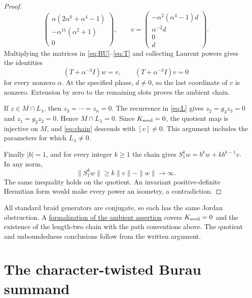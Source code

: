 \documentclass[11pt,a4paper]{article}
\begin{document}
\begin{proof}
\begin{equation}
\begin{pmatrix}
 \alpha(2\alpha^6+\alpha^4-1)\\
 -\alpha^{11}(\alpha^2+1)\\0
 \end{pmatrix},\qquad
 v=\begin{pmatrix}-\alpha^2(\alpha^4-1)d\\\alpha^{-2}d\\0\\d\end{pmatrix}.
\end{equation}
Multiplying the matrices in \eqref{eq:RU}--\eqref{eq:T} and
collecting Laurent powers gives the identities
\begin{equation}\label{eq:chain}
 (T+\alpha^{-3}I)w=v,\qquad (T+\alpha^{-3}I)v=0
\end{equation}
for every nonzero $\alpha$. At the specified phase, $d\ne0$,
so the last coordinate of $v$ is nonzero. Extension by zero to the
remaining slots proves the ambient chain.

If $z\in M\cap L_\lambda$, then $z_3=\cdots=z_n=0$.
The recurrence in \eqref{eq:L} gives $z_2=g_3z_3=0$ and
$z_1=g_2z_2=0$. Hence $M\cap L_\lambda=0$.
Since $K_{\rm seed}=0$, the quotient map is injective on $M$,
and \eqref{eq:chain} descends with $[v]\ne0$.
This argument includes the parameters for which $L_\lambda\ne0$.

Finally $|b|=1$, and for every integer $k\ge1$ the chain gives
$S_1^kw=b^kw+kb^{k-1}v$. In any norm,
\[
 \|S_1^kw\|\ge k\|v\|-\|w\|\longrightarrow\infty.
\]
The same inequality holds on the quotient. An invariant positive-definite
Hermitian form would make every power an isometry, a contradiction.
\end{proof}

All standard braid generators are conjugate, so each has the same
Jordan obstruction. A
\href{https://github.com/the-omega-institute/trureturing/blob/868ae8ef94f515b39323d972ccfd7120036bff79/D5/S3/Quantum/Algebra/JonesTemperleyLiebLongMoodyJordanObstruction.lean}{formalization of the ambient assertion}
covers $K_{\rm seed}=0$ and the existence of the length-two chain with
the path conventions above. The quotient and unboundedness conclusions
follow from the written argument.

\section{The character-twisted Burau summand}
\end{document}
